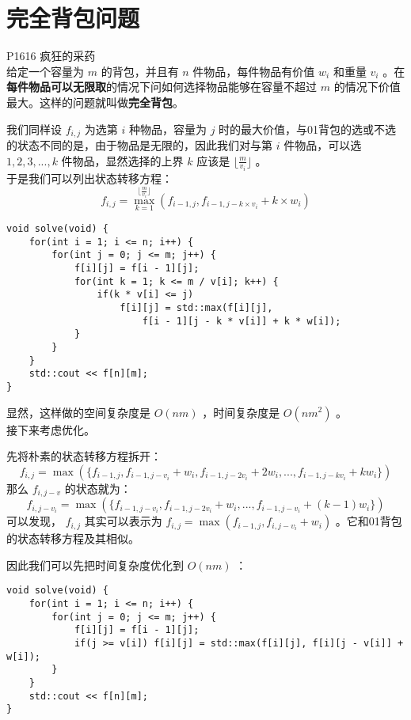 \documentclass{beamer}
\newcommand{\fdf}[1]{\alert{\textbf{#1}}}
\begin{document}
\section{完全背包问题}
\begin{frame}
P1616 疯狂的采药 \\ 
给定一个容量为 $m$ 的背包，并且有 $n$ 件物品，每件物品有价值 $w_i$ 和重量 $v_i$ 。在\fdf{每件物品可以无限取}的情况下问如何选择物品能够在容量不超过 $m$ 的情况下价值最大。这样的问题就叫做\fdf{完全背包}。
\end{frame}
\begin{frame}
我们同样设 $f_{i, j}$ 为选第 $i$ 种物品，容量为 $j$ 时的最大价值，与01背包的选或不选的状态不同的是，由于物品是无限的，因此我们对与第 $i$ 件物品，可以选 $1, 2, 3, ..., k$ 件物品，显然选择的上界 $k$ 应该是 $\lfloor \frac{m}{v_i} \rfloor$ 。  \\ 
于是我们可以列出状态转移方程：
$$f_{i, j} = \max_{k = 1}^{\lfloor \frac{m}{v_i} \rfloor}(f_{i - 1, j}, f_{i - 1, j - k \times v_i} + k \times w_i)$$
\end{frame}
\begin{frame}[fragile]
\begin{onlyenv}
\begin{verbatim}
void solve(void) {
    for(int i = 1; i <= n; i++) {
        for(int j = 0; j <= m; j++) {
            f[i][j] = f[i - 1][j];
            for(int k = 1; k <= m / v[i]; k++) {
                if(k * v[i] <= j) 
                    f[i][j] = std::max(f[i][j], 
                        f[i - 1][j - k * v[i]] + k * w[i]);
            }
        }
    }
    std::cout << f[n][m];
}
\end{verbatim}
\end{onlyenv}
显然，这样做的空间复杂度是 $O(nm)$ ，时间复杂度是 $O(nm^2)$ 。\\
接下来考虑优化。
\end{frame}
\begin{frame}
先将朴素的状态转移方程拆开：
$$f_{i, j} = \max(\{f_{i - 1,j }, f_{i - 1, j - v_i} + w_i, f_{i - 1, j - 2v_i} + 2w_i, ..., f_{i - 1, j - kv_i} + kw_i\})$$ 
那么 $f_{i, j - v}$ 的状态就为：
$$f_{i, j - v_i} = \max(\{f_{i - 1, j - v_i}, f_{i - 1, j - 2v_i} + w_i, ..., f_{i - 1, j - v_i} + (k - 1)w_i\})$$ 
可以发现， $f_{i, j}$ 其实可以表示为 $f_{i, j} = \max(f_{i - 1, j}, f_{i, j - v_i} + w_i)$ 。它和01背包的状态转移方程及其相似。
\end{frame}
\begin{frame}[fragile]
因此我们可以先把时间复杂度优化到 $O(nm)$ ：
\begin{onlyenv}
\begin{verbatim}
void solve(void) {
    for(int i = 1; i <= n; i++) {
        for(int j = 0; j <= m; j++) {
            f[i][j] = f[i - 1][j];
            if(j >= v[i]) f[i][j] = std::max(f[i][j], f[i][j - v[i]] + w[i]);
        }
    }
    std::cout << f[n][m];
}
\end{verbatim}
\end{onlyenv}
\end{frame}
\end{document}
